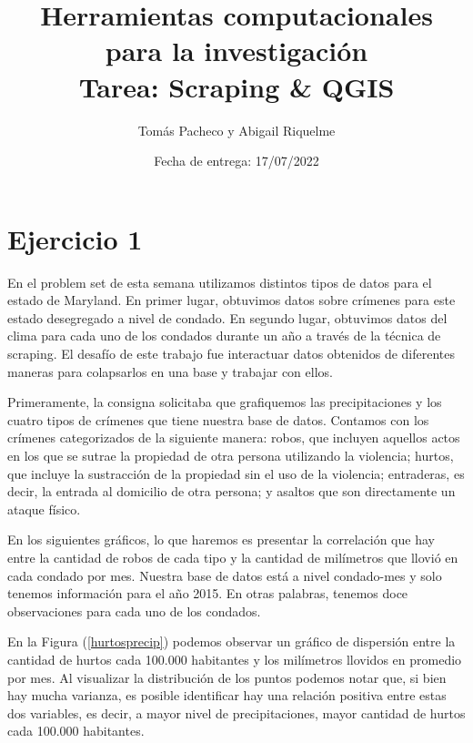 \documentclass[12pt]{article}
\title{ %
Herramientas computacionales para la investigaci\'on \\
\vspace{0.3cm}
\textbf{Tarea: Scraping \& QGIS }}
\author{Tom\'as Pacheco y Abigail Riquelme}
\date{Fecha de entrega: 17/07/2022}
\begin{document}
\maketitle
\onehalfspace


\section*{Ejercicio 1}

En el problem set de esta semana utilizamos distintos tipos de datos para el estado de Maryland. En primer lugar, obtuvimos datos sobre cr\'imenes para este estado desegregado a nivel de condado. En segundo lugar, obtuvimos datos del clima para cada uno de los condados durante un año a través de la técnica de scraping. El desafío de este trabajo fue interactuar datos obtenidos de diferentes maneras para colapsarlos en una base y trabajar con ellos. 

Primeramente, la consigna solicitaba que grafiquemos las precipitaciones y los cuatro tipos de crímenes que tiene nuestra base de datos. Contamos con los crímenes categorizados de la siguiente manera: robos, que incluyen aquellos actos en los que se sutrae la propiedad de otra persona utilizando la violencia; hurtos, que incluye la sustracción de la propiedad sin el uso de la violencia; entraderas, es decir, la entrada al domicilio de otra persona; y asaltos que son directamente un ataque físico. 

En los siguientes gráficos, lo que haremos es presentar la correlación que hay entre la cantidad de robos de cada tipo y la cantidad de milímetros que llovió en cada condado por mes. Nuestra base de datos está a nivel condado-mes y solo tenemos información para el año 2015. En otras palabras, tenemos doce observaciones para cada uno de los condados. 

En la Figura (\ref{hurtosprecip}) podemos observar un gr\'afico de dispersi\'on entre la cantidad de hurtos cada 100.000 habitantes y los mil\'imetros llovidos en promedio por mes. Al visualizar la distribuci\'on de los puntos podemos notar que, si bien hay mucha varianza, es posible identificar hay una relaci\'on positiva entre estas dos variables, es decir, a mayor nivel de precipitaciones, mayor cantidad de hurtos cada 100.000 habitantes. 
\end{document}
